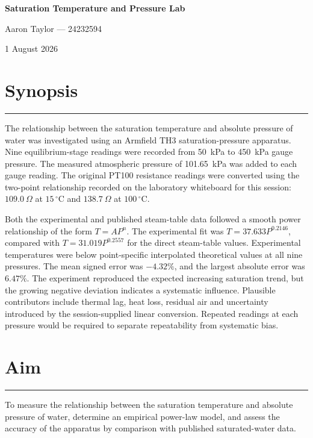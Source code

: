 \documentclass[11pt,a4paper]{article}
\newcommand{\sectionrule}{\vspace{-2pt}\color{rulegray}\hrule\color{black}\vspace{5pt}}
\begin{document}
\begin{center}
  {\LARGE\bfseries Saturation Temperature and Pressure Lab}\par
  \vspace{3mm}
  {\large Aaron Taylor --- 24232594}\par
  \vspace{1.5mm}
  {\large 1 August 2026}\par
\end{center}
\vspace{4mm}

\section*{Synopsis}
\sectionrule
The relationship between the saturation temperature and absolute pressure of
water was investigated using an Armfield TH3 saturation-pressure apparatus.
Nine equilibrium-stage readings were recorded from \SI{50}{\kilo\pascal} to
\SI{450}{\kilo\pascal} gauge pressure. The measured atmospheric pressure of
\SI{101.65}{\kilo\pascal} was added to each gauge reading. The original PT100
resistance readings were converted using the two-point relationship recorded
on the laboratory whiteboard for this session: $109.0~\Omega$ at
$15\,{}^\circ\mathrm{C}$ and $138.7~\Omega$ at $100\,{}^\circ\mathrm{C}$.

Both the experimental and published steam-table data followed a smooth power
relationship of the form $T=AP^n$. The experimental fit was
$T=37.633P^{0.2146}$, compared with $T=31.019P^{0.2557}$ for the direct
steam-table values. Experimental temperatures were below point-specific
interpolated theoretical values at all nine pressures. The mean signed error
was $-4.32\%$, and the largest absolute error was $6.47\%$. The experiment
reproduced the expected increasing saturation trend, but the growing negative
deviation indicates a systematic influence. Plausible contributors include
thermal lag, heat loss, residual air and uncertainty introduced by the
session-supplied linear conversion. Repeated readings at each pressure would
be required to separate repeatability from systematic bias.

\section{Aim}
\sectionrule
To measure the relationship between the saturation temperature and absolute
pressure of water, determine an empirical power-law model, and assess the
accuracy of the apparatus by comparison with published saturated-water data.
\end{document}
